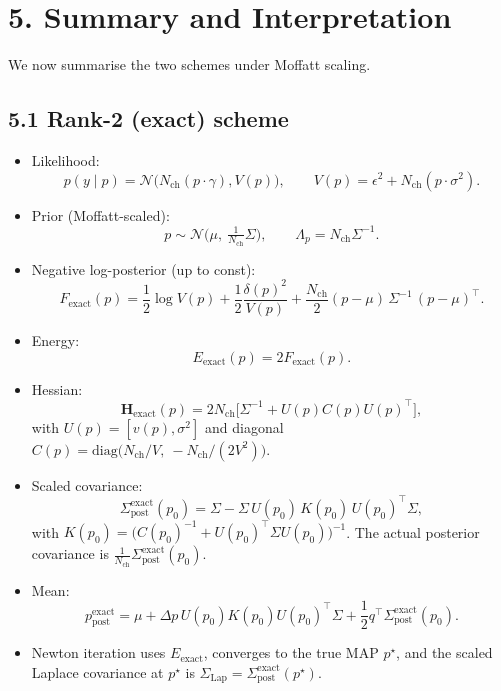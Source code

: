\documentclass[11pt]{article}
\begin{document}
\section*{5. Summary and Interpretation}

We now summarise the two schemes under Moffatt scaling.

\subsection*{5.1 Rank-2 (exact) scheme}

\begin{itemize}
  \item Likelihood:
    \[
      p(y\mid p) =
      \mathcal{N}\bigl(N_{\text{ch}}(p\cdot\gamma), V(p)\bigr),
      \qquad
      V(p) = \epsilon^2 + N_{\text{ch}}(p\cdot\sigma^2).
    \]
  \item Prior (Moffatt-scaled):
    \[
      p \sim \mathcal{N}\!\bigl(\mu,\ \tfrac{1}{N_{\text{ch}}}\Sigma\bigr),
      \qquad
      \Lambda_p = N_{\text{ch}}\Sigma^{-1}.
    \]
  \item Negative log-posterior (up to const):
    \[
      F_{\text{exact}}(p)
      =
      \frac{1}{2}\log V(p)
      + \frac{1}{2}\frac{\delta(p)^2}{V(p)}
      + \frac{N_{\text{ch}}}{2}(p-\mu)\,\Sigma^{-1}\,(p-\mu)^\top.
    \]
  \item Energy:
    \[
      E_{\text{exact}}(p) = 2F_{\text{exact}}(p).
    \]
  \item Hessian:
    \[
      \mathbf{H}_{\text{exact}}(p)
      =
      2N_{\text{ch}}
      \bigl[\Sigma^{-1} + U(p)C(p)U(p)^\top\bigr],
    \]
    with $U(p) = [v(p),\sigma^2]$ and diagonal
    $C(p) = \mathrm{diag}\bigl(N_{\text{ch}}/V,\ -N_{\text{ch}}/(2V^2)\bigr)$.
  \item Scaled covariance:
    \[
      \Sigma_{\text{post}}^{\text{exact}}(p_0)
      =
      \Sigma
      - \Sigma\,U(p_0)\,K(p_0)\,U(p_0)^\top\Sigma,
    \]
    with $K(p_0) = \bigl(C(p_0)^{-1} + U(p_0)^\top\Sigma U(p_0)\bigr)^{-1}$.
    The actual posterior covariance is
    $\tfrac{1}{N_{\text{ch}}}\Sigma_{\text{post}}^{\text{exact}}(p_0)$.
  \item Mean:
    \[
      p_{\text{post}}^{\text{exact}}
      =
      \mu
      + \Delta p\,U(p_0)K(p_0)U(p_0)^\top\Sigma
      + \frac{1}{2}q^\top
        \Sigma_{\text{post}}^{\text{exact}}(p_0).
    \]
  \item Newton iteration uses $E_{\text{exact}}$, converges to the
        true MAP $p^\star$, and the scaled Laplace covariance at
        $p^\star$ is
        $\Sigma_{\text{Lap}} = \Sigma_{\text{post}}^{\text{exact}}(p^\star)$.
\end{itemize}
\end{document}
